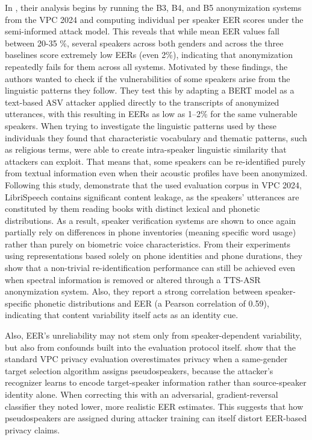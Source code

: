 \documentclass[12pt,leqno,a4paper]{article}
\begin{document}
In \cite{gaznepoglu2025sayexploitinglinguisticcontent}, their analysis begins by running the B3, B4, and B5 anonymization systems from the VPC 2024 
and computing individual per speaker EER scores under the semi-informed attack model. This reveals that while mean EER values fall between 20-35 \%, 
several speakers across both genders and across the three baselines score extremely low EERs (even 2\%), indicating that anonymization repeatedly 
fails for them across all systems. Motivated by these findings, the authors wanted to check if the vulnerabilities of some speakers arise from the linguistic patterns they follow. 
They test this by adapting a BERT model as a text-based ASV attacker applied directly to the transcripts of anonymized utterances, with this resulting in EERs as low as 1–2\% for the same vulnerable speakers. 
When trying to investigate the linguistic patterns used by these individuals they found that characteristic vocabulary and thematic patterns, such as religious terms, were able to create intra-speaker linguistic similarity that attackers can exploit.
That means that, some speakers can be re-identified purely from textual information even when their acoustic profiles have been anonymized. 
Following this study, \cite{franzreb_content_2026} demonstrate that the used evaluation corpus in VPC 2024, LibriSpeech contains significant content 
leakage, as the speakers' utterances are constituted by them reading books with distinct lexical and phonetic distributions. 
As a result, speaker verification systems are shown to once again partially rely on differences in phone inventories (meaning specific word usage) 
rather than purely on biometric voice characteristics. From their experiments using representations based solely on phone identities and phone durations, 
they show that a non-trivial re-identification performance can still be achieved even when spectral information is removed or altered through a TTS-ASR anonymization system. 
Also, they report a strong correlation between speaker-specific phonetic distributions and EER (a Pearson correlation of 0.59), indicating that content variability itself acts as an identity cue.

Also, EER's unreliability may not stem only from speaker-dependent variability, but also from confounds built into the evaluation protocol itself.
\cite{franzreb2026improvingspeakeranonymizationevaluations} show that the standard VPC privacy evaluation overestimates privacy when a same-gender 
target selection algorithm assigns pseudospeakers, because the attacker's recognizer learns to encode target-speaker information rather than source-speaker identity alone.
When correcting this with an adversarial, gradient-reversal classifier they noted lower, more realistic EER estimates. 
This suggests that how pseudospeakers are assigned during attacker training can itself distort EER-based privacy claims.
\end{document}
